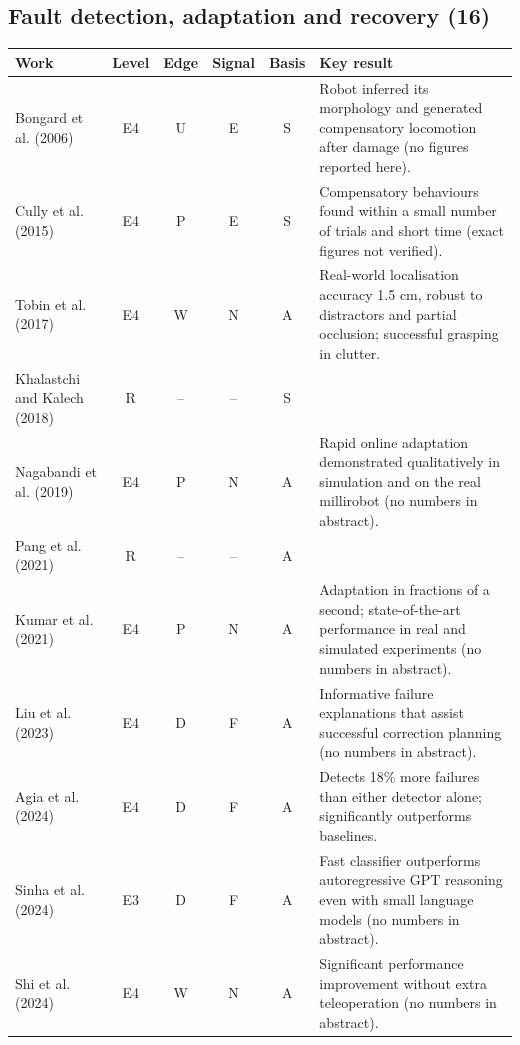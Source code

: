 \documentclass[10pt,a4paper]{article}
\begin{document}
\subsection*{Fault detection, adaptation and recovery (16)}
\begin{longtable}{@{}>{\raggedright\arraybackslash}p{4.0cm}cccc>{\raggedright\arraybackslash}p{7.6cm}@{}}
\toprule \textbf{Work} & \textbf{Level} & \textbf{Edge} & \textbf{Signal} & \textbf{Basis} & \textbf{Key result} \\ \midrule \endhead
Bongard et al. (2006)~\cite{Bongard2006} & E4 & U & E & S & Robot inferred its morphology and generated compensatory locomotion after damage (no figures reported here). \\
Cully et al. (2015)~\cite{Cully2015} & E4 & P & E & S & Compensatory behaviours found within a small number of trials and short time (exact figures not verified). \\
Tobin et al. (2017)~\cite{Tobin2017} & E4 & W & N & A & Real-world localisation accuracy 1.5 cm, robust to distractors and partial occlusion; successful grasping in clutter. \\
Khalastchi and Kalech (2018)~\cite{Khalastchi2018} & R & -- & -- & S &  \\
Nagabandi et al. (2019)~\cite{Nagabandi2019} & E4 & P & N & A & Rapid online adaptation demonstrated qualitatively in simulation and on the real millirobot (no numbers in abstract). \\
Pang et al. (2021)~\cite{Pang2021} & R & -- & -- & A &  \\
Kumar et al. (2021)~\cite{Kumar2021} & E4 & P & N & A & Adaptation in fractions of a second; state-of-the-art performance in real and simulated experiments (no numbers in abstract). \\
Liu et al. (2023)~\cite{Liu2023c} & E4 & D & F & A & Informative failure explanations that assist successful correction planning (no numbers in abstract). \\
Agia et al. (2024)~\cite{Agia2024} & E4 & D & F & A & Detects 18\% more failures than either detector alone; significantly outperforms baselines. \\
Sinha et al. (2024)~\cite{Sinha2024} & E3 & D & F & A & Fast classifier outperforms autoregressive GPT reasoning even with small language models (no numbers in abstract). \\
Shi et al. (2024)~\cite{Shi2024} & E4 & W & N & A & Significant performance improvement without extra teleoperation (no numbers in abstract). \\

\end{longtable}
\end{document}
